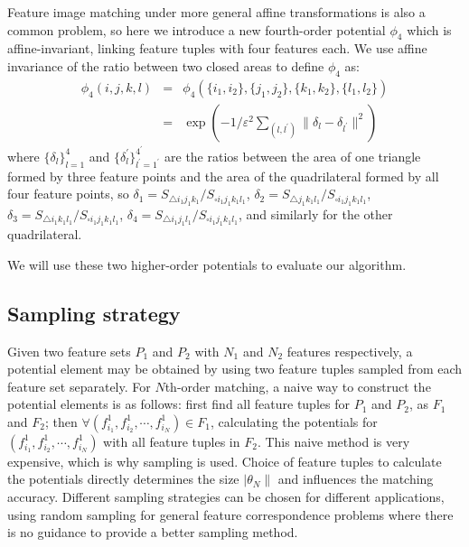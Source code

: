Feature image matching under  more general affine transformations is also a common problem,
so here we introduce a new fourth-order potential $\phi_4$ which is affine-invariant, linking feature tuples with four features each.
We use affine invariance of the ratio between two closed areas to define $\phi_4$ as:
%
\begin{eqnarray}
\phi_4(i,j,k,l)&=&\phi_4(\{i_1,i_2\}, \{j_1,j_2\}, \{k_1,k_2\}, \{l_1,l_2\}) \nonumber \\
&=&\exp(-1/\varepsilon^2\sum\nolimits_{(l,l^{'})}\lVert \delta_l- \delta_{l^{'} } \lVert^2 )
\end{eqnarray}
where $\{\delta_l\}_{l=1}^4$  and $\{\delta_l^{'}\}_{l^{'}=1^{'}}^{4^{'}}$ are the ratios between the area of one triangle formed by three feature points and the area of the quadrilateral formed by all four feature points, so
$\delta_1=S_{\triangle i_1 j_1 k_1}/S_{\square i_1 j_1 k_1 l_1}$, $\delta_2=S_{\triangle j_1 k_1 l_1}/S_{\square i_1 j_1 k_1 l_1}$, $\delta_3=S_{\triangle i_1 k_1 l_1}/S_{\square i_1 j_1 k_1 l_1}$, $\delta_4=S_{\triangle i_1 j_1 l_1}/S_{\square i_1 j_1 k_1 l_1}$,
and similarly for the other quadrilateral.

We will use these two higher-order potentials to evaluate our algorithm.

\subsection{Sampling strategy}
\label{subsec:sampling}

Given two feature sets $P_1$ and $P_2$ with $N_1$ and $N_2$ features respectively,
a potential element may be obtained by using two feature tuples sampled from each feature set separately.
For $N$th-order matching, a naive way to construct the potential elements is as follows:
first find all feature tuples for $P_1$ and $P_2$, as $F_1$ and $F_2$; then $\forall (f_{i_1}^1, f_{i_2}^1, \cdots, f_{i_N}^1)\in F_1$,
calculating the potentials for $(f_{i_1}^1, f_{i_2}^1, \cdots, f_{i_N}^1)$ with all feature tuples in $F_2$.
This naive method is very expensive, which is why sampling is used.
Choice of feature tuples to calculate the potentials directly determines the size $|\theta_N\|$ and influences the matching accuracy.
Different sampling strategies can be chosen for different applications,
using random sampling for general feature correspondence problems where there is no guidance to provide a better sampling method.

